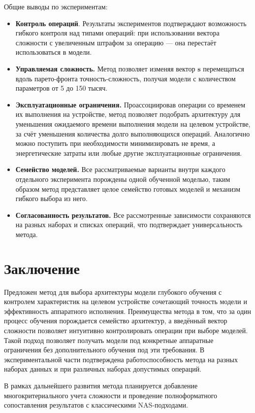 \documentclass{article}
\begin{document}
Общие выводы по экспериментам:

\begin{itemize}

\item \textbf{Контроль операций}. Результаты экспериментов подтверждают возможность гибкого контроля над типами операций: при использовании вектора сложности с увеличенным штрафом за операцию --- она перестаёт использоваться в модели. 
\item \textbf{Управляемая сложность.} Метод позволяет изменяя вектор $\boldsymbol{s}$ перемещаться вдоль парето-фронта точность-сложность, получая модели с количеством параметров от 5 до 150 тысяч.
\item \textbf{Эксплуатационные ограничения.} Проассоциировав операции со временем их выполнения на устройстве, метод позволяет подобрать архитектуру для уменьшения ожидаемого времени выполнения модели на целевом устройстве, за счёт уменьшения количества долго выполняющихся операций. Аналогично можно поступить при необходимости минимизировать не время, а энергетические затраты или любые другие эксплуатационные ограничения.
\item \textbf{Семейство моделей.} Все рассматриваемые варианты внутри каждого отдельного эксперимента порождены одной обученной моделью, таким образом метод представляет целое семейство готовых моделей и механизм гибкого выбора из него.
\item \textbf{Согласованность результатов.} Все рассмотренные зависимости сохраняются на разных наборах и списках операций, что подтверждает универсальность метода.

\end{itemize}


\section{Заключение}

Предложен метод для выбора архитектуры модели глубокого обучения с контролем характеристик на целевом устройстве сочетающий точность модели и эффективность  аппаратного исполнения. Преимущества метода в том, что за один процесс обучения порождается семейство архитектур, а введённый вектор сложности позволяет интуитивно контролировать операции при выборе моделей. Такой подход позволяет получать модели под конкретные аппаратные ограничения без дополнительного обучения под эти требования. В экспериментальной части подтверждена работоспособность метода на разных наборах данных и при различных наборах допустимых операций.  


В рамках дальнейшего развития метода планируется добавление многокритериального учета сложности и проведение полноформатного сопоставления результатов с классическими NAS-подходами.




\end{document}
